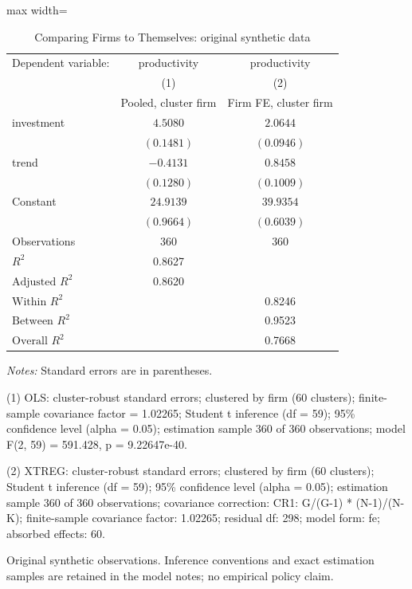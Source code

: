 \begin{table}[htbp]
\centering
\caption{Comparing Firms to Themselves: original synthetic data}
\label{tab:11-panel-fixed-effects}
\begingroup
\small
\setlength{\tabcolsep}{6pt}
\renewcommand{\arraystretch}{1.12}
\begin{adjustbox}{max width=\linewidth}
\begin{tabular}{@{}lcc@{}}
\toprule
Dependent variable: & productivity & productivity \\
 & (1) & (2) \\
 & Pooled, cluster firm & Firm FE, cluster firm \\
\midrule
investment & $4.5080$ & $2.0644$ \\
 & $(0.1481)$ & $(0.0946)$ \\[0.35em]
trend & $-0.4131$ & $0.8458$ \\
 & $(0.1280)$ & $(0.1009)$ \\[0.35em]
Constant & $24.9139$ & $39.9354$ \\
 & $(0.9664)$ & $(0.6039)$ \\[0.35em]
\midrule
Observations & 360 & 360 \\
$R^{2}$ & 0.8627 &  \\
$\text{Adjusted }R^{2}$ & 0.8620 &  \\
$\text{Within }R^{2}$ &  & 0.8246 \\
$\text{Between }R^{2}$ &  & 0.9523 \\
$\text{Overall }R^{2}$ &  & 0.7668 \\
\bottomrule
\end{tabular}
\end{adjustbox}
\par\smallskip
\begin{minipage}{\linewidth}
\footnotesize
\raggedright
\textit{Notes:} Standard errors are in parentheses.\par
(1) OLS: cluster-robust standard errors; clustered by firm (60 clusters); finite-sample covariance factor = 1.02265; Student t inference (df = 59); 95\% confidence level (alpha = 0.05); estimation sample 360 of 360 observations; model F(2, 59) = 591.428, p = 9.22647e-40.\par
(2) XTREG: cluster-robust standard errors; clustered by firm (60 clusters); Student t inference (df = 59); 95\% confidence level (alpha = 0.05); estimation sample 360 of 360 observations; covariance correction: CR1: G/(G-1) * (N-1)/(N-K); finite-sample covariance factor: 1.02265; residual df: 298; model form: fe; absorbed effects: 60.\par
Original synthetic observations. Inference conventions and exact estimation samples are retained in the model notes; no empirical policy claim.\par
\end{minipage}
\endgroup
\end{table}
